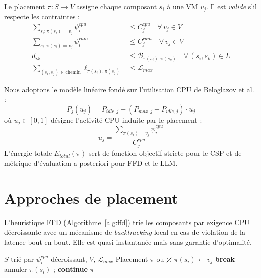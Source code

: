 ﻿\documentclass[systeme]{compas2026}
\begin{document}
Le placement $\pi : S \rightarrow V$ assigne chaque composant $s_i$ à une VM $v_j$. Il est \emph{valide} s'il respecte les contraintes :
\begin{align}
    \sum_{s_i : \pi(s_i)=v_j} \psi_i^{cpu} &\leq C_j^{cpu} \quad \forall\, v_j \in V \label{eq:cst_cpu} \\
    \sum_{s_i : \pi(s_i)=v_j} \psi_i^{ram} &\leq C_j^{ram} \quad \forall\, v_j \in V \label{eq:cst_ram} \\
    d_{ik} &\leq \mathcal{B}_{\pi(s_i),\pi(s_k)} \quad \forall\, (s_i, s_k) \in L \label{eq:cst_bw} \\
    \sum_{(s_i, s_j) \in \text{chemin}} \ell_{\pi(s_i), \pi(s_j)} &\leq \mathcal{L}_{max} \label{eq:cst_latency}
\end{align}

Nous adoptons le modèle linéaire fondé sur l'utilisation CPU de Beloglazov et al.~\cite{beloglazov2012energy} :
\begin{equation}\label{eq:power}
    P_j(u_j) = P_{idle,j} + (P_{max,j} - P_{idle,j}) \cdot u_j
\end{equation}
où $u_j \in [0,1]$ désigne l'activité CPU induite par le placement :
\begin{equation}\label{eq:util}
    u_j = \frac{\sum_{\pi(s_i) = v_j} \psi_i^{cpu}}{C_j^{cpu}}
\end{equation}
L'énergie totale $E_{total}(\pi)$ sert de fonction objectif stricte pour le CSP et de métrique d'évaluation a posteriori pour FFD et le LLM.

\section{Approches de placement}
\label{sec:approaches}

L'heuristique FFD (Algorithme~\ref{alg:ffd}) trie les composants par exigence CPU décroissante avec un mécanisme de \emph{backtracking} local en cas de violation de la latence bout-en-bout. Elle est quasi-instantanée mais sans garantie d'optimalité.

\begin{algorithm}[H]
\caption{First Fit Decreasing (FFD)}
\label{alg:ffd}
\footnotesize
\begin{algorithmic}[1]
\Require $S$ trié par $\psi_i^{cpu}$ décroissant, $V$, $\mathcal{L}_{max}$
\Ensure Placement $\pi$ ou $\varnothing$
            \State $\pi(s_i) \leftarrow v_j$
                \State \textbf{break}
            \Else
                \State annuler $\pi(s_i)$ ; \textbf{continue}
            \EndIf
        \EndIf
    \EndFor
\EndFor
\State \Return $\pi$
\end{algorithmic}
\end{algorithm}
\end{document}
